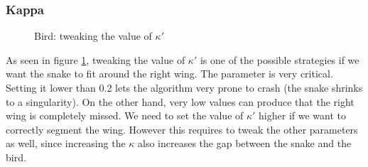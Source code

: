 \subsubsection{Kappa}

\begin{figure}[!hbt]
\centering
{}

\caption{Bird: tweaking the value of $ \kappa' $}
\label{fig:ex2-kappa-tweak}
\end{figure}

As seen in figure \ref{fig:ex2-kappa-tweak}, tweaking the value of $\kappa'$ is one
of the possible strategies if we want the snake to fit around the right wing. The
parameter is very critical. Setting it lower than 0.2 lets the algorithm very prone
to crash (the snake shrinks to a singularity). On the other
hand, very low values can produce that the right wing is completely missed. We need
to set the value of $\kappa'$ higher if we want to correctly segment the wing. However
this requires to tweak the other parameters as well, since increasing the $ \kappa $ also
increases the gap between the snake and the bird.

